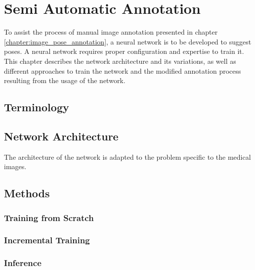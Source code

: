 \chapter{Semi Automatic Annotation} \label{chapter:semi_automatic}

To assist the process of manual image annotation presented in chapter \ref{chapter:image_pose_annotation}, a neural network is to be developed to suggest poses. A neural network requires proper configuration and expertise to train it. This chapter describes the network architecture and its variations, as well as different approaches to train the network and the modified annotation process resulting from the usage of the network.

\section{Terminology}

\section{Network Architecture}

The architecture of the network is adapted to the problem specific to the medical images.





\section{Methods}



\subsection{Training from Scratch}

\subsection{Incremental Training}

\subsection{Inference}


